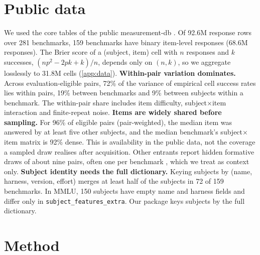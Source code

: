 \documentclass{article}
\begin{document}
\section{Public data}\label{sec:data}
We used the core tables of the public measurement-db \citep{measurementdb2026}. Of 92.6M response rows over 281 benchmarks, 159 benchmarks have binary item-level responses (68.6M responses). The Brier score of a (subject, item) cell with $n$ responses and $k$ successes, $(np^2-2pk+k)/n$, depends only on $(n,k)$, so we aggregate losslessly to 31.8M cells (\cref{app:data}).
\textbf{Within-pair variation dominates.} Across evaluation-eligible pairs, 72\% of the variance of empirical cell success rates lies within pairs, 19\% between benchmarks and 9\% between subjects within a benchmark. The within-pair share includes item difficulty, subject$\times$item interaction and finite-repeat noise.
\textbf{Items are widely shared before sampling.} For 96\% of eligible pairs (pair-weighted), the median item was answered by at least five other subjects, and the median benchmark's subject$\times$item matrix is 92\% dense. This is availability in the public data, not the coverage a sampled draw realises after acquisition. Other entrants report hidden formative draws of about nine pairs, often one per benchmark \citep{brierrabbit2026,doctawho2026}, which we treat as context only.
\textbf{Subject identity needs the full dictionary.} Keying subjects by (name, harness, version, effort) merges at least half of the subjects in 72 of 159 benchmarks. In MMLU, 150 subjects have empty name and harness fields and differ only in \texttt{subject\_features\_extra}. Our package keys subjects by the full dictionary.

\section{Method}\label{sec:method}
\end{document}
